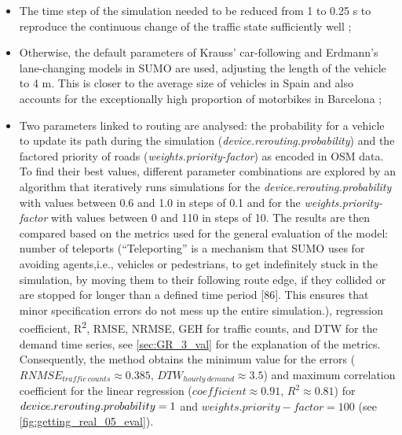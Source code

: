 \begin{itemize}
    \item The time step of the simulation needed to be reduced from 1 to 0.25 s to reproduce the continuous change of the traffic state sufficiently well \citep{Lieberman1996};
    \item Otherwise, the default parameters of Krauss’ car-following \citep{Krauss1997} and Erdmann’s lane-changing \citep{Erdmann2015} models in SUMO are used, adjusting the length of the vehicle to 4 m. This is closer to the average size of vehicles in Spain \citep{Mock2020} and also accounts for the exceptionally high proportion of motorbikes in Barcelona \citep{InstitutdEstudisRegionalsiMetropolitansdeBarcelonaIERMB2020,Marquet2016};
    \item Two parameters linked to routing are analysed: the probability for a vehicle to update its path during the simulation (\emph{device.rerouting.probability}) \citep{InTAS} and the factored priority of roads (\emph{weights.priority-factor}) as encoded in OSM data. To find their best values, different parameter combinations are explored by an algorithm that iteratively runs simulations for the \emph{device.rerouting.probability} with values between 0.6 and 1.0 in steps of 0.1 and for the \emph{weights.priority-factor} with values between 0 and 110 in steps of 10. The results are then compared based on the metrics used for the general evaluation of the model: number of teleports (``Teleporting'' is a mechanism that SUMO uses for avoiding agents,i.e., vehicles or pedestrians, to get indefinitely stuck in the simulation, by moving them to their following route edge, if they collided or are stopped for longer than a defined time period [86]\citep{GermanAerospaceCenterDLRandothers2021teleporting}. This ensures that minor specification errors do not mess up the entire simulation.), regression coefficient, R\textsuperscript{2}, RMSE, NRMSE, GEH for traffic counts, and DTW for the demand time series, see \autoref{sec:GR_3_val} for the explanation of the metrics. Consequently, the method obtains the minimum value for the errors ($RNMSE_{traffic\ counts} \approx 0.385$, $DTW_{hourly\ demand} \approx 3.5$) and maximum correlation coefficient for the linear regression ($coefficient \approx 0.91$, $R^2 \approx 0.81$) for $device.rerouting.\\probability = 1$ and $weights.priority-factor = 100$ (see \autoref{fig:getting_real_05_eval}).
\end{itemize}

